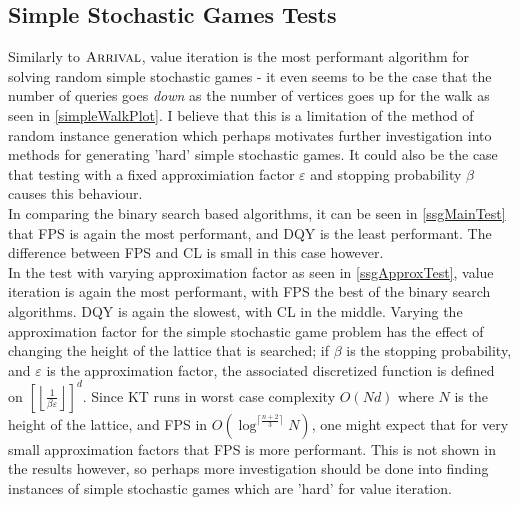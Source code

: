 \subsection{Simple Stochastic Games Tests}
Similarly to $\textsc{Arrival}$, value iteration is the most performant algorithm for solving
random simple stochastic games - it even seems to be the case
that the number of queries goes \emph{down} as the number of vertices
goes up for the walk as seen in \cref{simpleWalkPlot}. 
I believe that this is a limitation of the method
of random instance generation which perhaps motivates further investigation
into methods for generating 'hard' simple stochastic games. It could also
be the case that testing with a fixed approximiation factor $\varepsilon$
and stopping probability $\beta$ causes this behaviour. \\
In comparing the binary search based algorithms, it can be seen in \cref{ssgMainTest} 
that
FPS is again the most performant, and DQY is the least performant. The difference
between FPS and CL is small in this case however. \\
In the test with varying approximation factor as seen in \cref{ssgApproxTest}, value iteration 
is again the most performant, with FPS the best of the binary search algorithms.
DQY is again the slowest, with CL in the middle. Varying the approximation factor
for the simple stochastic game problem has the effect of changing the height of the lattice
that is searched; if $\beta$ is the stopping probability, and $\varepsilon$ is the approximation
factor, the associated discretized function is 
defined on $\left[\left \lfloor \frac{1}{\beta \varepsilon}\right \rfloor\right]^d$.
Since KT runs in worst case complexity $O(Nd)$ where $N$ is the height of the lattice,
and FPS in $O(\log^{\lceil \frac{n + 2}{3} \rceil} N)$, one might expect that for
very small approximation factors that FPS is more performant. This is not shown in
the results however, so perhaps more investigation should be done into finding
instances of simple stochastic games which are 'hard' for value iteration.

